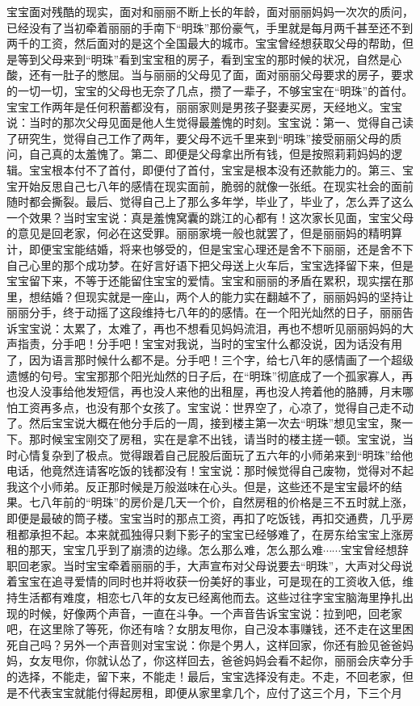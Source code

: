 宝宝面对残酷的现实，面对和丽丽不断上长的年龄，面对丽丽妈妈一次次的质问，已经没有了当初牵着丽丽的手南下“明珠”那份豪气，手里就是每月两千甚至还不到两千的工资，然后面对的是这个全国最大的城市。宝宝曾经想获取父母的帮助，但是等到父母来到“明珠”看到宝宝租的房子，看到宝宝的那时候的状况，自然是心酸，还有一肚子的憋屈。当与丽丽的父母见了面，面对丽丽父母要求的房子，要求的一切一切，宝宝的父母也无奈了几点，攒了一辈子，不够宝宝在“明珠”的首付。宝宝工作两年是任何积蓄都没有，丽丽家则是男孩子娶妻买房，天经地义。宝宝说：当时的那次父母见面是他人生觉得最羞愧的时刻。宝宝说：第一、觉得自己读了研究生，觉得自己工作了两年，要父母不远千里来到“明珠”接受丽丽父母的质问，自己真的太羞愧了。第二、即便是父母拿出所有钱，但是按照莉莉妈妈的逻辑。宝宝根本付不了首付，即便付了首付，宝宝是根本没有还款能力的。第三、宝宝开始反思自己七八年的感情在现实面前，脆弱的就像一张纸。在现实社会的面前随时都会撕裂。最后、觉得自己上了那么多年学，毕业了，毕业了，怎么弄了这么一个效果？当时宝宝说：真是羞愧窝囊的跳江的心都有！这次家长见面，宝宝父母的意见是回老家，何必在这受罪。丽丽家境一般也就罢了，但是丽丽妈的精明算计，即便宝宝能结婚，将来也够受的，但是宝宝心理还是舍不下丽丽，还是舍不下自己心里的那个成功梦。在好言好语下把父母送上火车后，宝宝选择留下来，但是宝宝留下来，不等于还能留住宝宝的爱情。宝宝和丽丽的矛盾在累积，现实摆在那里，想结婚？但现实就是一座山，两个人的能力实在翻越不了，丽丽妈妈的坚持让丽丽分手，终于动摇了这段维持七八年的的感情。在一个阳光灿然的日子，丽丽告诉宝宝说：太累了，太难了，再也不想看见妈妈流泪，再也不想听见丽丽妈妈的大声指责，分手吧！分手吧！宝宝对我说，当时的宝宝什么都没说，因为话没有用了，因为语言那时候什么都不是。分手吧！三个字，给七八年的感情画了一个超级遗憾的句号。宝宝那那个阳光灿然的日子后，在“明珠”彻底成了一个孤家寡人，再也没人没事给他发短信，再也没人来他的出租屋，再也没人挎着他的胳膊，月末哪怕工资再多点，也没有那个女孩了。宝宝说：世界空了，心凉了，觉得自己走不动了。然后宝宝说大概在他分手后的一周，接到楼主第一次去“明珠”想见宝宝，聚一下。那时候宝宝刚交了房租，实在是拿不出钱，请当时的楼主搓一顿。宝宝说，当时心情复杂到了极点。觉得跟着自己屁股后面玩了五六年的小师弟来到“明珠”给他电话，他竟然连请客吃饭的钱都没有！宝宝说：那时候觉得自己废物，觉得对不起我这个小师弟。反正那时候是万般滋味在心头。但是，这些还不是宝宝最坏的结果。七八年前的“明珠”的房价是几天一个价，自然房租的价格是三不五时就上涨，即便是最破的筒子楼。宝宝当时的那点工资，再扣了吃饭钱，再扣交通费，几乎房租都承担不起。本来就孤独得只剩下影子的宝宝已经够难了，在房东给宝宝上涨房租的那天，宝宝几乎到了崩溃的边缘。怎么那么难，怎么那么难$\cdots\cdots$宝宝曾经想辞职回老家。当时宝宝牵着丽丽的手，大声宣布对父母说要去“明珠”，大声对父母说着宝宝在追寻爱情的同时也并将收获一份美好的事业，可是现在的工资收入低，维持生活都有难度，相恋七八年的女友已经离他而去。这些过往字宝宝脑海里挣扎出现的时候，好像两个声音，一直在斗争。一个声音告诉宝宝说：拉到吧，回老家吧，在这里除了等死，你还有啥？女朋友甩你，自己没本事赚钱，还不走在这里困死自己吗？另外一个声音则对宝宝说：你是个男人，这样回家，你还有脸见爸爸妈妈，女友甩你，你就认怂了，你这样回去，爸爸妈妈会看不起你，丽丽会庆幸分手的选择，不能走，留下来，不能走！最后，宝宝选择没有走。不走，不回老家，但是不代表宝宝就能付得起房租，即便从家里拿几个，应付了这三个月，下三个月